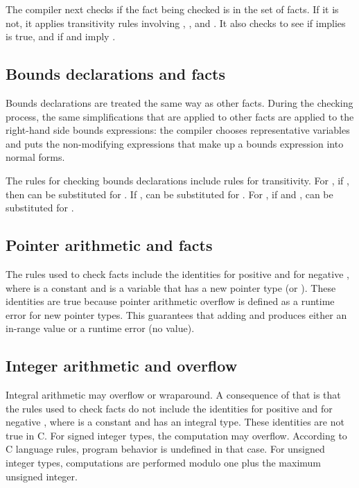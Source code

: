 The compiler next checks if the fact being checked is in the set of
facts. If it is not, it applies transitivity rules involving
\code{<}, \code{<=}, and \code{==}.
It also checks to see if \code{<}
implies \code{!=} is true, and if \code{<=} and
\code{>=} imply \code{==}.

\subsection{Bounds declarations and facts}

Bounds declarations are treated the same way as other facts. During the
checking process, the same simplifications that are applied to other
facts are applied to the right-hand side bounds expressions: the
compiler chooses representative variables and puts the non-modifying
expressions that make up a bounds expression into normal forms.

The rules for checking bounds declarations include rules for
transitivity. For , if
 \code{<=} , then  can
be substituted for . 
If  \code{<=} ,  can be substituted for
.  For , if
 \code{<=}  and  ,
 can be substituted for .

\subsection{Pointer arithmetic and facts}

The rules used to check facts include the identities  \code{<}  \code{+} 
for positive  and  \code{+}  \code{<}  for
negative , where  is a
constant and  is a variable that has a new pointer type (\ptr or \arrayptr).
These identities are true
because pointer arithmetic overflow is defined as a runtime error for
new pointer types. This guarantees that adding  and  produces either
an in-range value or a runtime error (no value).

\subsection{Integer arithmetic and overflow}
\label{section:where-clauses-and-overflow}

Integral arithmetic may overflow or wraparound. A consequence of that is
that the rules used to check facts do not include the identities 
 \code{<}  \code{+}  
for positive  and  \code{+}  \code{<}  for 
negative , where  is a
constant and  has an integral type. These identities are not true in C.  For signed integer types, the computation  \code{+} 
may overflow.   According to C language
rules, program behavior is undefined in that case.  For unsigned
integer types, computations are performed modulo one plus
the maximum unsigned integer.

